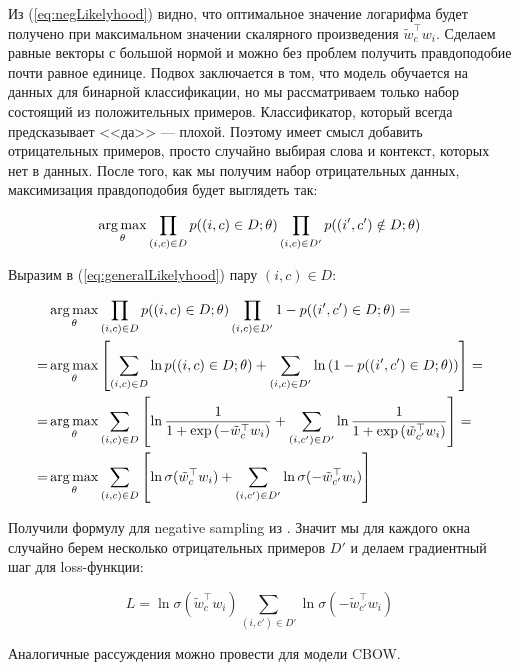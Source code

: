 Из (\ref{eq:negLikelyhood}) видно, что оптимальное значение логарифма будет получено при максимальном значении
скалярного произведения $\tilde{w}_c^{\top} w_i$. Сделаем равные векторы с большой нормой и можно без проблем
получить правдоподобие почти равное единице. Подвох заключается в том, что модель обучается на данных для
бинарной классификации, но мы рассматриваем только набор состоящий из положительных примеров. Классификатор,
который всегда предсказывает <<да>> --- плохой. Поэтому имеет смысл добавить отрицательных примеров, просто
случайно выбирая слова и контекст, которых нет в данных. После того, как мы получим набор отрицательных
данных, максимизация правдоподобия будет выглядеть так:

\begin{equation} \label{eq:generalLikelyhood}
 \operatorname*{arg\,max}_{\theta} \prod_{(i,c)\in D} p((i,c)\in D;\theta) \prod_{(i,c)\in D'} p((i',c')\notin D;\theta)
\end{equation}

Выразим в (\ref{eq:generalLikelyhood}) пару $(i,c) \in D$:

\begin{equation}
\begin{aligned}
 & \operatorname*{arg\,max}_{\theta} \prod_{(i,c)\in D} p((i,c)\in D;\theta) \prod_{(i,c)\in D'} 1-p((i',c')\in D;\theta) = \\
 = & \operatorname*{arg\,max}_{\theta} \left[\sum_{(i,c)\in D} \ln{p((i,c)\in D;\theta)} + \sum_{(i,c)\in D'} \ln{(
1-p((i',c')\in D;\theta))} \right] = \\
 = & \operatorname*{arg\,max}_{\theta} \sum_{(i,c)\in D} \left[\ln{\frac{1}{1+\exp{(-\tilde{w}_c^{\top} w_i)}}} +
\sum_{(i,c')\in D'} \ln{\frac{1}{1+\exp{(\tilde{w}_{c'}^{\top} w_i)}}} \right] = \\
 = & \operatorname*{arg\,max}_{\theta} \sum_{(i,c)\in D} \left[\ln\sigma(\tilde{w}_c^{\top} w_i) + \sum_{(i,c')\in D'}
\ln\sigma(-\tilde{w}_{c'}^{\top} w_i)\right]
\end{aligned}
\end{equation}

Получили формулу для negative sampling из \cite{Mikolov:2}. Значит мы для каждого окна случайно берем
несколько отрицательных примеров $D'$ и делаем градиентный шаг для loss-функции:

\begin{equation}
 L = \ln\sigma(\tilde{w}_c^{\top} w_i) \sum_{(i,c')\in D'} \ln\sigma(-\tilde{w}_{c'}^{\top} w_i)
\end{equation}

Аналогичные рассуждения можно провести для модели CBOW.

